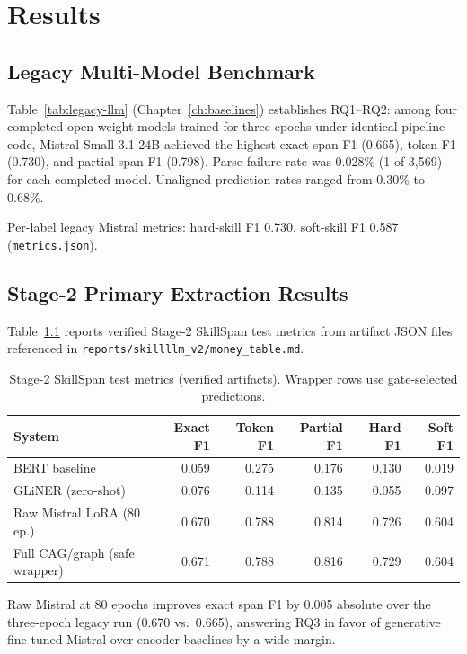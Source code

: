 \chapter{Results}
\label{ch:results}

\section{Legacy Multi-Model Benchmark}

Table~\ref{tab:legacy-llm} (Chapter~\ref{ch:baselines}) establishes RQ1--RQ2: among four completed open-weight models trained for three epochs under identical pipeline code, Mistral Small 3.1 24B achieved the highest exact span F1 (0.665), token F1 (0.730), and partial span F1 (0.798).
Parse failure rate was 0.028\% (1 of 3{,}569) for each completed model.
Unaligned prediction rates ranged from 0.30\% to 0.68\%.

Per-label legacy Mistral metrics: hard-skill F1 0.730, soft-skill F1 0.587 (\texttt{metrics.json}).

\section{Stage-2 Primary Extraction Results}

Table~\ref{tab:stage2-money} reports verified Stage-2 SkillSpan test metrics from artifact JSON files referenced in \texttt{reports/skillllm\_v2/money\_table.md}.

\begin{table}[htbp]
  \centering
  \caption{Stage-2 SkillSpan test metrics (verified artifacts). Wrapper rows use gate-selected predictions.}
  \label{tab:stage2-money}
  \small
  \begin{tabular}{lrrrrr}
    \toprule
    System & Exact F1 & Token F1 & Partial F1 & Hard F1 & Soft F1 \\
    \midrule
    BERT baseline & 0.059 & 0.275 & 0.176 & 0.130 & 0.019 \\
    GLiNER (zero-shot) & 0.076 & 0.114 & 0.135 & 0.055 & 0.097 \\
    Raw Mistral LoRA (80 ep.) & 0.670 & 0.788 & 0.814 & 0.726 & 0.604 \\
    Full CAG/graph (safe wrapper) & 0.671 & 0.788 & 0.816 & 0.729 & 0.604 \\
    \bottomrule
  \end{tabular}
\end{table}

Raw Mistral at 80 epochs improves exact span F1 by 0.005 absolute over the three-epoch legacy run (0.670 vs.\ 0.665), answering RQ3 in favor of generative fine-tuned Mistral over encoder baselines by a wide margin.

